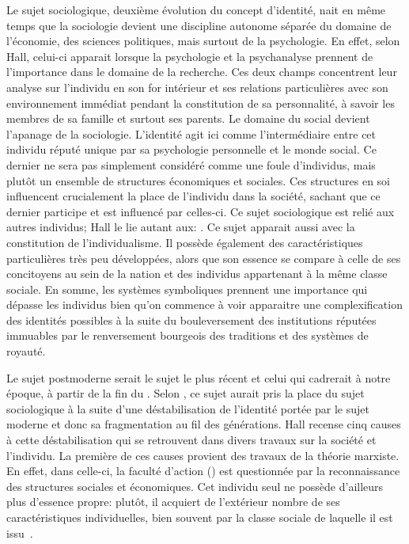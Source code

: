Le sujet sociologique, deuxième évolution du concept d'identité, nait en même temps que la sociologie devient une discipline autonome séparée du domaine de l'économie, des sciences politiques, mais surtout de la psychologie.
En effet, selon Hall, celui-ci apparait lorsque la psychologie et la psychanalyse prennent de l'importance dans le domaine de la recherche.
Ces deux champs concentrent leur analyse sur l'individu en son for intérieur et ses relations particulières avec son environnement immédiat pendant la constitution de sa personnalité, à savoir les membres de sa famille et surtout ses parents.
Le domaine du social devient l'apanage de la sociologie.
L'identité agit ici comme l'intermédiaire entre cet individu réputé unique par sa psychologie personnelle et le monde social.
Ce dernier ne sera pas simplement considéré comme une foule d'individus, mais plutôt un ensemble de structures économiques et sociales.
Ces structures en soi influencent crucialement la place de l'individu dans la société, sachant que ce dernier participe et est influencé par celles-ci.
Ce sujet sociologique est relié aux autres individus; Hall le lie autant aux: .
Ce sujet apparait aussi avec la constitution de l'individualisme.
Il possède également des caractéristiques particulières très peu développées, alors que son essence se compare à celle de ses concitoyens au sein de la nation et des individus appartenant à la même classe sociale.
En somme, les systèmes symboliques prennent une importance qui dépasse les individus bien qu'on commence à voir apparaitre une complexification des identités possibles à la suite du bouleversement des institutions réputées immuables par le renversement bourgeois des traditions et des systèmes de royauté. 

Le sujet postmoderne serait le sujet le plus récent et celui qui cadrerait à notre époque, à partir de la fin du .
Selon \citeauthor{Hall1996a}, ce sujet aurait pris la place du sujet sociologique à la suite d'une déstabilisation de l'identité portée par le sujet moderne et donc sa fragmentation au fil des générations.
Hall recense cinq causes à cette déstabilisation qui se retrouvent dans divers travaux sur la société et l'individu.
La première de ces causes provient des travaux de la théorie marxiste.
En effet, dans celle-ci, la faculté d'action () est questionnée par la reconnaissance des structures sociales et économiques.
Cet individu seul ne possède d'ailleurs plus d'essence propre: plutôt, il acquiert de l'extérieur nombre de ses caractéristiques individuelles, bien souvent par la classe sociale de laquelle il est issu~\citeyearpar[606]{Hall1996a}.

